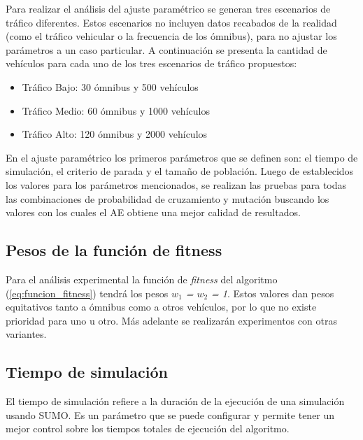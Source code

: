 Para realizar el análisis del ajuste paramétrico se generan tres escenarios de tráfico diferentes. Estos escenarios no incluyen datos recabados de la realidad (como el tráfico vehicular o la frecuencia de los ómnibus), para no ajustar los parámetros a un caso particular.
A continuación se presenta la cantidad de vehículos para cada uno de los tres escenarios de tráfico propuestos:

\begin{itemize}
	\item Tráfico Bajo: 30 ómnibus y 500 vehículos	
	\item Tráfico Medio: 60 ómnibus y 1000 vehículos
	\item Tráfico Alto: 120 ómnibus y 2000 vehículos
\end{itemize}


En el ajuste paramétrico los primeros parámetros que se definen son: el tiempo de simulación, el criterio de parada y el tamaño de población. Luego de establecidos los valores para los parámetros mencionados, se realizan las pruebas para todas las combinaciones de probabilidad de cruzamiento y mutación buscando los valores con los cuales el AE obtiene una mejor calidad de resultados.


\subsection{Pesos de la función de fitness}

Para el análisis experimental la función de \emph{fitness} del algoritmo (\ref{eq:funcion_fitness}) tendrá los pesos \emph{$w_1$ = $w_2$ = 1}. Estos valores dan pesos equitativos tanto a ómnibus como a otros vehículos, por lo que no existe prioridad para uno u otro. Más adelante se realizarán experimentos con otras variantes.


\subsection{Tiempo de simulación}
El tiempo de simulación refiere a la duración de la ejecución de una simulación usando SUMO. Es un parámetro que se puede configurar y permite tener un mejor control sobre los tiempos totales de ejecución del algoritmo.

